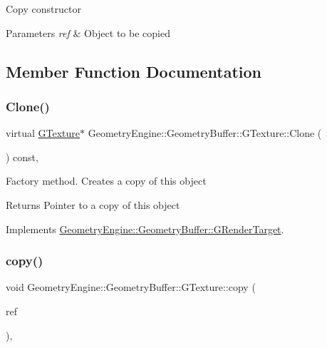 Copy constructor 
\begin{DoxyParams}{Parameters}
{\em ref} & Object to be copied \\
\hline
\end{DoxyParams}


\subsection{Member Function Documentation}
\mbox{\label{class_geometry_engine_1_1_geometry_buffer_1_1_g_texture_ad8a2b027a88527a03b925448d98efcbf}} 
\subsubsection{\texorpdfstring{Clone()}{Clone()}}
{\footnotesize\ttfamily virtual \mbox{\hyperlink{class_geometry_engine_1_1_geometry_buffer_1_1_g_texture}{G\+Texture}}$\ast$ Geometry\+Engine\+::\+Geometry\+Buffer\+::\+G\+Texture\+::\+Clone (\begin{DoxyParamCaption}{ }\end{DoxyParamCaption}) const\hspace{0.3cm}{\ttfamily [inline]}, {\ttfamily [virtual]}}

Factory method. Creates a copy of this object \begin{DoxyReturn}{Returns}
Pointer to a copy of this object 
\end{DoxyReturn}


Implements \mbox{\hyperlink{class_geometry_engine_1_1_geometry_buffer_1_1_g_render_target_a3b14d8929cf9d2acb6bc263c709ff019}{Geometry\+Engine\+::\+Geometry\+Buffer\+::\+G\+Render\+Target}}.

\mbox{\label{class_geometry_engine_1_1_geometry_buffer_1_1_g_texture_aff15a7cb82c8cd1ecf8654e9e62df62e}} 
\subsubsection{\texorpdfstring{copy()}{copy()}}
{\footnotesize\ttfamily void Geometry\+Engine\+::\+Geometry\+Buffer\+::\+G\+Texture\+::copy (\begin{DoxyParamCaption}\item[{const \mbox{\hyperlink{class_geometry_engine_1_1_geometry_buffer_1_1_g_texture}{G\+Texture}} \&}]{ref }\end{DoxyParamCaption})\hspace{0.3cm}{\ttfamily [protected]}, {\ttfamily [virtual]}}

